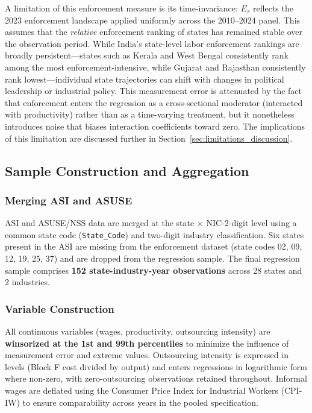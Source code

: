 A limitation of this enforcement measure is its time-invariance: $E_s$ reflects the 2023 enforcement landscape applied uniformly across the 2010--2024 panel. This assumes that the \textit{relative} enforcement ranking of states has remained stable over the observation period. While India's state-level labor enforcement rankings are broadly persistent---states such as Kerala and West Bengal consistently rank among the most enforcement-intensive, while Gujarat and Rajasthan consistently rank lowest---individual state trajectories can shift with changes in political leadership or industrial policy. This measurement error is attenuated by the fact that enforcement enters the regression as a cross-sectional moderator (interacted with productivity) rather than as a time-varying treatment, but it nonetheless introduces noise that biases interaction coefficients toward zero. The implications of this limitation are discussed further in Section~\ref{sec:limitations_discussion}.

\subsection{Sample Construction and Aggregation}

\subsubsection{Merging ASI and ASUSE}

ASI and ASUSE/NSS data are merged at the state $\times$ NIC-2-digit level using a common state code (\texttt{State\_Code}) and two-digit industry classification. Six states present in the ASI are missing from the enforcement dataset (state codes 02, 09, 12, 19, 25, 37) and are dropped from the regression sample. The final regression sample comprises \textbf{152 state-industry-year observations} across 28 states and 2 industries.

\subsubsection{Variable Construction}

All continuous variables (wages, productivity, outsourcing intensity) are \textbf{winsorized at the 1st and 99th percentiles} to minimize the influence of measurement error and extreme values. Outsourcing intensity is expressed in levels (Block F cost divided by output) and enters regressions in logarithmic form where non-zero, with zero-outsourcing observations retained throughout. Informal wages are deflated using the Consumer Price Index for Industrial Workers (CPI-IW) to ensure comparability across years in the pooled specification.

